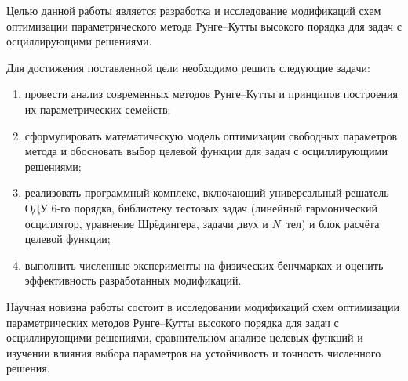 Целью данной работы является разработка и исследование модификаций схем оптимизации параметрического метода Рунге--Кутты высокого порядка для задач с осциллирующими решениями.

Для достижения поставленной цели необходимо решить следующие задачи:
\begin{enumerate}
	\item провести анализ современных методов Рунге--Кутты и принципов построения их параметрических семейств;
	\item сформулировать математическую модель оптимизации свободных параметров метода и обосновать выбор целевой функции для задач с осциллирующими решениями;
	\item реализовать программный комплекс, включающий универсальный решатель ОДУ 6-го порядка, библиотеку тестовых задач (линейный гармонический осциллятор, уравнение Шрёдингера, задачи двух и $N$~тел) и блок расчёта целевой функции;
	\item выполнить численные эксперименты на физических бенчмарках и оценить эффективность разработанных модификаций.
\end{enumerate}

Научная новизна работы состоит в исследовании модификаций схем оптимизации параметрических методов Рунге--Кутты высокого порядка для задач с осциллирующими решениями, сравнительном анализе целевых функций и изучении влияния выбора параметров на устойчивость и точность численного решения.